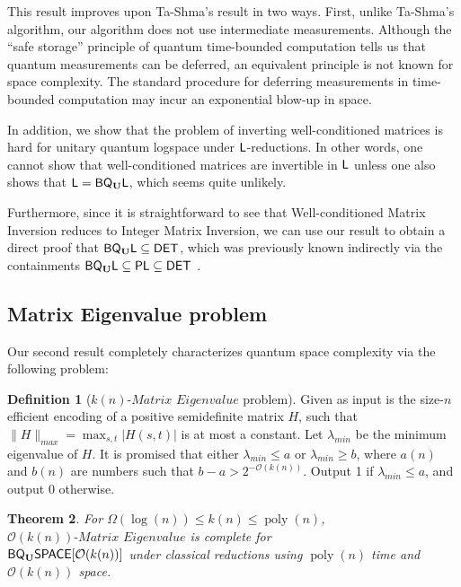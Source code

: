 \documentclass[11pt]{article}
\newtheorem{theorem}{Theorem}
\theoremstyle{definition}
\newtheorem{definition}[theorem]{Definition}
\theoremstyle{remark}
\newcommand\DET{{\sf{DET}}}
\newcommand\PLclass{{\sf{PL}}}
\newcommand\Logspace{{\sf{L}}}
\newcommand\spechamiltonian[1]{#1\textit{-Matrix Eigenvalue}}
\newcommand{\classfont}{\sf}
\newcommand{\Unitary}{\mathbf{U}}
\newcommand{\unitaryBQL}{{\classfont{BQ}_\Unitary\classfont{L}}}
\newcommand{\unitaryBQSPACE}[1]{{\classfont{BQ}_\Unitary\classfont{SPACE}}[#1]}
\newcommand\bigoh{\mathcal{O}}
\newcommand{\cl}[1]{{\color{purple}{[{\bf cl:}#1]}}}
\DeclareMathOperator{\poly}{poly}
\begin{document}
This result improves upon Ta-Shma's result \cite{tashma} in two ways. First, unlike Ta-Shma's algorithm, our algorithm does not use intermediate measurements.  Although the ``safe storage'' principle of quantum time-bounded computation tells us that quantum measurements can be deferred, an equivalent principle is not known for space complexity.  The standard procedure for deferring measurements in time-bounded computation may incur an exponential blow-up in space.  

In addition, we show that the problem of inverting well-conditioned matrices is hard for unitary quantum logspace under $\Logspace$-reductions. In other words, one cannot show that well-conditioned matrices are invertible in $\Logspace$ unless one also shows that $\Logspace=\unitaryBQL$, which seems quite unlikely.

Furthermore, since it is straightforward to see that Well-conditioned Matrix Inversion reduces to Integer Matrix Inversion, we can use our result to obtain a direct proof that $\unitaryBQL\subseteq\DET$, which was previously known indirectly via the containments $\unitaryBQL\subseteq\PLclass\subseteq\DET$ \cite{Watrous03,Borodin84}.

\subsection{Matrix Eigenvalue problem} 
Our second result completely characterizes quantum space complexity via the following problem:
\begin{definition}[$\spechamiltonian{k(n)}$ problem] \label{def: spechamiltonian}
Given as input is the size-$n$ efficient encoding of a positive semidefinite matrix $H$, such that%
$\|H\|_{max} = \max_{s,t}|H(s,t)|$ is at most a constant. Let $\lambda_{min}$ be the minimum eigenvalue of $H$. It is promised that either $\lambda_{min} \le a$ or $\lambda_{min} \ge b$, where $a(n)$ and $b(n)$ are numbers such that $b-a > 2^{-\mathcal{O}(k(n))}$. Output 1 if $\lambda_{min} \le a$, and output 0 otherwise.
\end{definition}

\begin{theorem} \label{thm: spechamiltonian}
For $\Omega(\log(n)) \le k(n) \le \poly(n)$, $\spechamiltonian{\mathcal{O}(k(n))}$ is complete for \\ $\unitaryBQSPACE{\mathcal{O}(k(n))}$ under classical reductions using $\poly(n)$ time and $\mathcal{O}(k(n))$ space.
\end{theorem}
\end{document}
